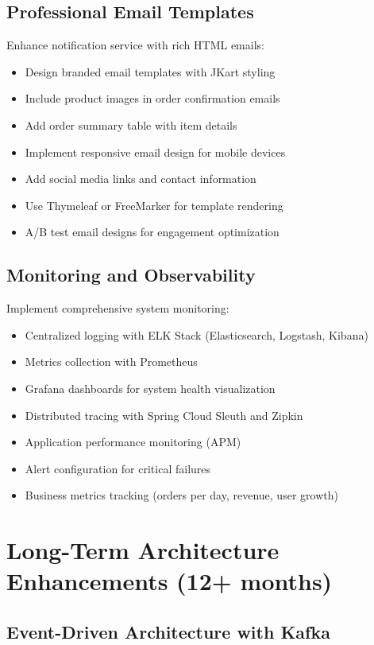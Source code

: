 \subsection{Professional Email Templates}

Enhance notification service with rich HTML emails:
\begin{itemize}
    \item Design branded email templates with JKart styling
    \item Include product images in order confirmation emails
    \item Add order summary table with item details
    \item Implement responsive email design for mobile devices
    \item Add social media links and contact information
    \item Use Thymeleaf or FreeMarker for template rendering
    \item A/B test email designs for engagement optimization
\end{itemize}

\subsection{Monitoring and Observability}

Implement comprehensive system monitoring:
\begin{itemize}
    \item Centralized logging with ELK Stack (Elasticsearch, Logstash, Kibana)
    \item Metrics collection with Prometheus
    \item Grafana dashboards for system health visualization
    \item Distributed tracing with Spring Cloud Sleuth and Zipkin
    \item Application performance monitoring (APM)
    \item Alert configuration for critical failures
    \item Business metrics tracking (orders per day, revenue, user growth)
\end{itemize}

\section{Long-Term Architecture Enhancements (12+ months)}

\subsection{Event-Driven Architecture with Kafka}

